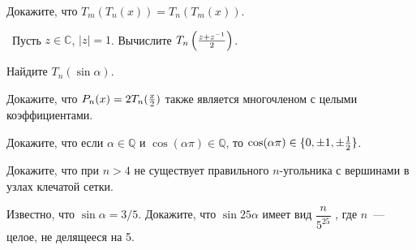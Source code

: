 \documentclass[14pt,DIV14]{scrartcl}
\begin{document}
\begin{task}
\sub Докажите, что $T_m(T_n(x))=T_n(T_m(x))$.

\sub ~Пусть $z\in\mathbb C$, $|z|=1$. Вычислите $T_n\left({z+z^{-1}\over2}\right)$.

\sub Найдите $T_n(\sin \alpha)$.
\end{task}
\begin{task}
Докажите, что $P_n(x)=2T_n({x\over2})$ также является многочленом с целыми коэффициентами.

\sub Докажите, что если $\alpha\in\mathbb{Q}$ и $\cos(\alpha\pi)\in\mathbb{Q}$, то $\cos(\alpha\pi)\in\{0,\pm1,\pm{1\over2}\}$.

\sub Докажите, что при $n>4$ не существует правильного $n$-угольника с вершинами в узлах клечатой сетки.
\end{task}
\begin{task}
Известно, что $\sin \alpha = 3/5$. Докажите, что $\sin 25\alpha$ имеет вид
$\dfrac{n}{5^{25}}$ , где $n$~--- целое, не делящееся на 5.
\end{task}
\end{document}
